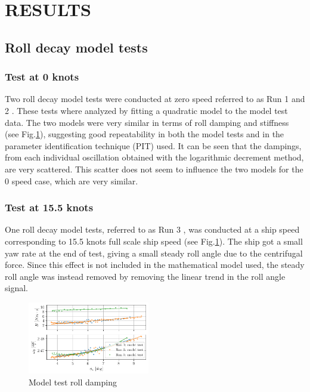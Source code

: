 \section*{RESULTS}\label{results}
\subsection*{Roll decay model tests}\label{roll-decay-model-tests}
\subsubsection*{Test at 0 knots}\label{test-at-0-knots}
Two roll decay model tests were conducted at zero speed referred to as
Run 1 and 2 \citep{7505983/5DP3HN8F}.
These tests where analyzed by fitting a quadratic model
to the model test data. The two models were very similar in terms of
roll damping and stiffness (see Fig.\ref{fig:mdl}), suggesting
good repeatability in both the model tests and in the parameter
identification technique (PIT) used. It can be seen that the dampings,
from each individual oscillation obtained with the logarithmic decrement
method, are very scattered. This scatter does not seem to influence the
two models for the 0 speed case, which are very similar.
\subsubsection*{Test at 15.5 knots}\label{test-at-15.5-knots}
One roll decay model tests, referred to as Run 3
\citep{7505983/5DP3HN8F}, was conducted at a ship speed corresponding to
15.5 knots full scale ship speed (see Fig.\ref{fig:mdl}). The
ship got a small yaw rate
at the end of test, giving a small steady roll angle due to the
centrifugal force. Since this effect is not included in the mathematical
model used, the steady roll angle was instead removed by removing the
linear trend in the roll angle signal.
\begin{figure}[H]
\begin{center}\includegraphics[width = 0.475\textwidth]{figures/mdl.pdf}\end{center}
\vspace{-1cm}
\caption{Model test roll damping}
\label{fig:mdl}
\end{figure}
